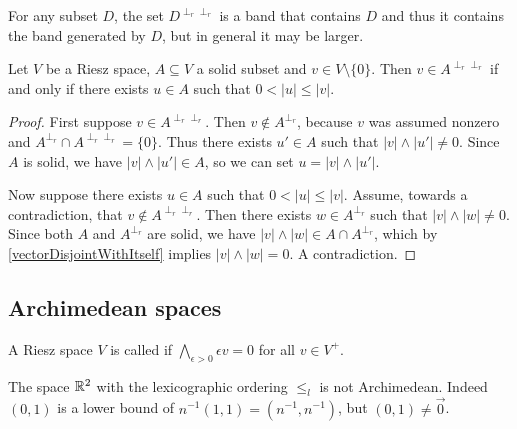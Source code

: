 For any subset $D$, the set $D^{\perp_r\perp_r}$ is a band that contains $D$ and thus it contains the band generated by $D$, but in general it may be larger.

\begin{proposition} \label{disjointDoublePolarConstruction}
Let $V$ be a Riesz space, $A\subseteq V$ a solid subset and $v\in V\setminus\{0\}$. Then $v\in A^{\perp_r\perp_r}$ \textup{if and only if} there exists $u\in A$ such that $0 < |u| \leq |v|$.
\end{proposition}
\begin{proof}
First suppose $v\in A^{\perp_r\perp_r}$. Then $v\notin A^{\perp_r}$, because $v$ was assumed nonzero and $A^{\perp_r}\cap A^{\perp_r\perp_r} = \{0\}$. Thus there exists $u'\in A$ such that $|v|\wedge |u'| \neq 0$. Since $A$ is solid, we have $|v|\wedge |u'| \in A$, so we can set $u = |v|\wedge |u'|$.

Now suppose there exists $u\in A$ such that $0 < |u| \leq |v|$. Assume, towards a contradiction, that $v\notin A^{\perp_r\perp_r}$. Then there exists $w\in A^{\perp_r}$ such that $|v|\wedge |w| \neq 0$. Since both $A$ and $A^{\perp_r}$ are solid, we have $|v|\wedge |w| \in A\cap A^{\perp_r}$, which by \ref{vectorDisjointWithItself} implies $|v|\wedge |w| = 0$. A contradiction.
\end{proof}

\subsection{Archimedean spaces}
\begin{definition}
A Riesz space $V$ is called  if $\bigwedge_{\epsilon > 0}\epsilon v = 0$ for all $v\in V^+$.
\end{definition}

\begin{example}
The space $\mathbb{R}^2$ with the lexicographic ordering $\leq_l$ is not Archimedean. Indeed $(0,1)$ is a lower bound of $n^{-1}(1,1) = (n^{-1}, n^{-1})$, but $(0,1) \neq \vec{0}$.
\end{example}


